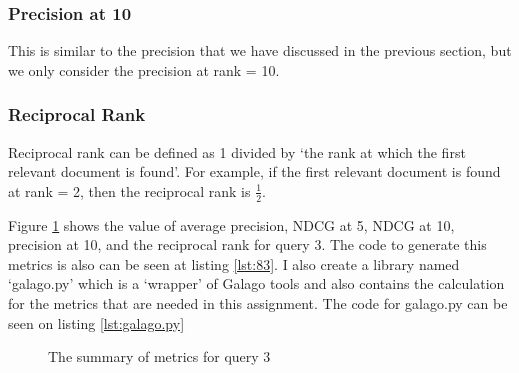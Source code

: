 \documentclass[letterpaper,11pt]{article}
\begin{document}
\subsubsection*{Precision at 10}
This is similar to the precision that we have discussed in the previous section, but we only consider the precision at rank = 10. 

\subsubsection*{Reciprocal Rank}
Reciprocal rank can be defined as 1 divided by `the rank at which the first relevant document is found'. For example, if the first relevant document is found at rank = 2, then the reciprocal rank is \(\frac{1}{2} \).

Figure \ref{fig:83_query3_metrics} shows the value of average precision, NDCG at 5, NDCG at 10, precision at 10, and the reciprocal rank for query 3. The code to generate this metrics is also can be seen at listing \ref{lst:83}. I also create a library named `galago.py' which is a `wrapper' of Galago tools and also contains the calculation for the metrics that are needed in this assignment. The code for galago.py can be seen on listing \ref{lst:galago.py}

\begin{figure}[H]
	\centering
	\caption{The summary of metrics for query 3}
	\label{fig:83_query3_metrics}
\end{figure}
\end{document}
